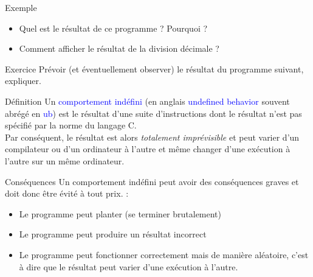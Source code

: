 \documentclass[10pt]{beamer}
\begin{document}
\begin{frame}[fragile]{\Ctitle}{\stitle}
	\begin{exampleblock}{Exemple}
		\begin{itemize}
			\item<2-> Quel est le résultat de ce programme ? Pourquoi ?
			\item<3-> Comment afficher le résultat de la division décimale ?
		\end{itemize}
	\end{exampleblock}
\end{frame}

\begin{frame}[fragile]{\Ctitle}{\stitle}
	\begin{exampleblock}{Exercice}
		Prévoir (et éventuellement observer) le résultat du programme suivant, expliquer.
	\end{exampleblock}
\end{frame}

\begin{frame}{\Ctitle}{\stitle}
	\begin{alertblock}{Définition}
		Un \textcolor{blue}{comportement indéfini} (en anglais \textcolor{blue}{undefined behavior} souvent abrégé en \textcolor{blue}{\sc ub}) est le résultat d'une suite d'instructions dont le résultat n'est pas spécifié par la norme du langage C. \\
		Par conséquent, le résultat est alors \textit{\textcolor{BrickRed}{totalement imprévisible}} et peut varier d'un compilateur ou d'un ordinateur à l'autre et même changer d'une exécution à l'autre sur un même ordinateur.
	\end{alertblock}
	{\begin{block}{Conséquences}
		Un comportement indéfini peut avoir des conséquences graves et doit donc être évité à tout prix. :
		\begin{itemize}
			\item Le programme peut planter (se terminer brutalement)
			\item Le programme peut produire un résultat incorrect
			\item Le programme peut fonctionner correctement mais de manière aléatoire, c'est à dire que le résultat peut varier d'une exécution à l'autre.
		\end{itemize}
	\end{block}}
\end{frame}
\end{document}
